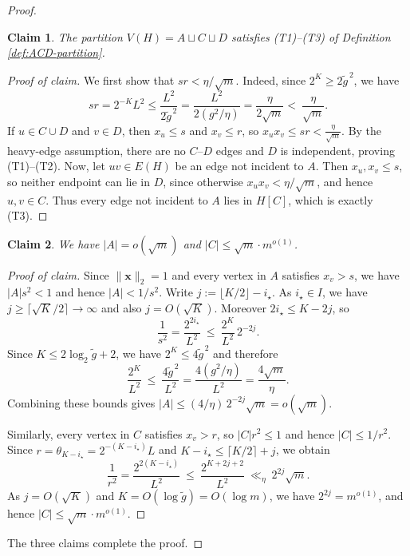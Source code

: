 \documentclass[10pt,a4paper]{amsart}
\newtheorem{claim}{Claim}
\newenvironment{poc}{\begin{proof}[Proof of claim]\renewcommand*{\qedsymbol}{$\blacksquare$}}{\end{proof}}
\begin{document}
\begin{proof}
\begin{claim}
    The partition $V(H)=A\sqcup C\sqcup D$ satisfies \textup{(T1)}--\textup{(T3)} of Definition \ref{def:ACD-partition}. 
\end{claim}

\begin{poc}
We first show that $sr<\eta/\sqrt m$.
Indeed, since $2^K\ge 2\widetilde g^{\,2}$, we have
\[
  sr
  =
  2^{-K}L^2
  \le
  \frac{L^2}{2\widetilde g^{\,2}}
  =
  \frac{L^2}{2(g^2/\eta)}
  =
  \frac{\eta}{2\sqrt m}
  <\ \frac{\eta}{\sqrt m}.
\]
If $u\in C\cup D$ and $v\in D$, then $x_u\le s$ and $x_v\le r$, so $x_ux_v\le sr< \frac{\eta}{\sqrt m}$.
By the heavy-edge assumption, there are no $C$--$D$ edges and $D$ is independent, proving \textup{(T1)}--\textup{(T2)}. 
Now, let $uv\in E(H)$ be an edge not incident to $A$.
Then $x_u,x_v\le s$, so neither endpoint can lie in $D$, since otherwise \(x_ux_v<\eta/\sqrt m\), and hence $u,v\in C$.
Thus every edge not incident to $A$ lies in $H[C]$, which is exactly \textup{(T3)}.
\end{poc}

\begin{claim}
    We have $|A|=o(\sqrt m)$ and 
  $|C|\le \sqrt m\cdot m^{o(1)}$. 
\end{claim}

\begin{poc}
Since $\|\bm{x}\|_2=1$ and every vertex in $A$ satisfies $x_v>s$, we have $|A|s^2<1$ and hence $|A|<1/s^2$.
Write $j:=\lfloor K/2\rfloor-i_\star$.
As $i_\star\in I$, we have $j\ge \lceil \sqrt K/2\rceil\to\infty$ and also $j=O(\sqrt K)$.
Moreover $2i_\star\le K-2j$, so
\[
  \frac{1}{s^2}=\frac{2^{2i_\star}}{L^2}\ \le\ \frac{2^K}{L^2}\,2^{-2j}.
\]
Since $K\le 2\log_2 \widetilde g+2$, we have $2^K\le 4\widetilde g^{\,2}$ and therefore
\[
  \frac{2^K}{L^2}\ \le\ \frac{4\widetilde g^{\,2}}{L^2}
  =\frac{4(g^2/\eta)}{L^2}
  =\frac{4\sqrt m}{\eta}.
\]
Combining these bounds gives $|A|\le (4/\eta)\,2^{-2j}\sqrt m=o(\sqrt m)$.

Similarly, every vertex in $C$ satisfies $x_v>r$, so $|C|r^2\le 1$ and hence $|C|\le 1/r^2$.
Since $r=\theta_{K-i_\star}=2^{-(K-i_\star)}L$ and $K-i_\star\le \lceil K/2\rceil+j$, we obtain
\[
  \frac{1}{r^2}=\frac{2^{2(K-i_\star)}}{L^2}\ \le\ \frac{2^{K+2j+2}}{L^2}
  \ \ll_\eta\ 2^{2j}\sqrt m.
\]
As $j=O(\sqrt K)$ and $K=O(\log \widetilde g)=O(\log m)$, we have $2^{2j}=m^{o(1)}$, and hence $|C|\le \sqrt m\cdot m^{o(1)}.$
\end{poc}

The three claims complete the proof.
\end{proof}
\end{document}
